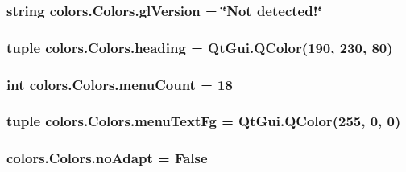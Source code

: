 \subsubsection[{gl\+Version}]{\setlength{\rightskip}{0pt plus 5cm}string colors.\+Colors.\+gl\+Version = \char`\"{}Not detected!\char`\"{}\hspace{0.3cm}{\ttfamily [static]}}\label{classcolors_1_1Colors_abc0a79de7eb4e2423c5faa6fbd602888}
\hypertarget{classcolors_1_1Colors_ad50ebf76e91ac21dee363a113a8765e3}{}
\subsubsection[{heading}]{\setlength{\rightskip}{0pt plus 5cm}tuple colors.\+Colors.\+heading = Qt\+Gui.\+Q\+Color(190, 230, 80)\hspace{0.3cm}{\ttfamily [static]}}\label{classcolors_1_1Colors_ad50ebf76e91ac21dee363a113a8765e3}
\hypertarget{classcolors_1_1Colors_ac4834654f04dd38a5326be3a81875471}{}
\subsubsection[{menu\+Count}]{\setlength{\rightskip}{0pt plus 5cm}int colors.\+Colors.\+menu\+Count = 18\hspace{0.3cm}{\ttfamily [static]}}\label{classcolors_1_1Colors_ac4834654f04dd38a5326be3a81875471}
\hypertarget{classcolors_1_1Colors_aa540a94e2a571575f05f2d2aa0fbd9f2}{}
\subsubsection[{menu\+Text\+Fg}]{\setlength{\rightskip}{0pt plus 5cm}tuple colors.\+Colors.\+menu\+Text\+Fg = Qt\+Gui.\+Q\+Color(255, 0, 0)\hspace{0.3cm}{\ttfamily [static]}}\label{classcolors_1_1Colors_aa540a94e2a571575f05f2d2aa0fbd9f2}
\hypertarget{classcolors_1_1Colors_a98295558247560e81e70f96330bf90d9}{}
\subsubsection[{no\+Adapt}]{\setlength{\rightskip}{0pt plus 5cm}colors.\+Colors.\+no\+Adapt = {\bf False}\hspace{0.3cm}{\ttfamily [static]}}\label{classcolors_1_1Colors_a98295558247560e81e70f96330bf90d9}
\hypertarget{classcolors_1_1Colors_a6b742b01b8520ccc9ddd820d21b8e21c}{}
